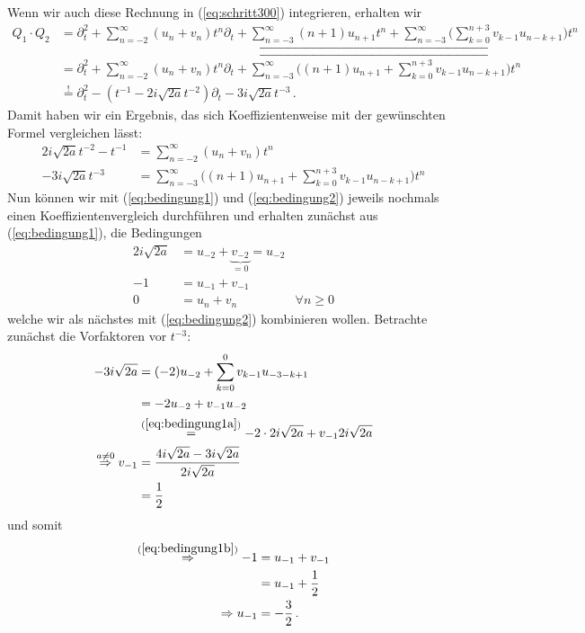 Wenn wir auch diese Rechnung in (\ref{eq:schritt300}) integrieren, erhalten wir
\begin{align*} \label{eq:schritt400}
Q_1\cdot Q_2&=\partial_t^2 + \sum_{n=-2}^\infty (u_n+v_n)t^n \partial_t
  + \underbracket{\sum_{n=-3}^\infty (n+1)u_{n+1}t^{n}
  + \sum_{n=-3}^\infty \Big( \sum_{k=0}^{n+3} v_{k-1}u_{n-k+1} \Big) t^{n}}
\\&=\partial_t^2 + \sum_{n=-2}^\infty (u_n+v_n)t^n \partial_t
  + \overbracket{\sum_{n=-3}^\infty
  \Big( (n+1)u_{n+1} + \sum_{k=0}^{n+3} v_{k-1}u_{n-k+1} \Big) t^{n}}
\\&\overset{!}{=} \partial_t^2 - (t^{-1} - 2i\sqrt{2a}t^{-2})\partial_t
  - 3 i\sqrt{2a}t^{-3} \,.
\end{align*}
Damit haben wir ein Ergebnis, das sich Koeffizientenweise mit der gewünschten
Formel vergleichen lässt:
\begin{align}
\label{eq:bedingung1}
2i\sqrt{2a}t^{-2} - t^{-1} &= \sum_{n=-2}^\infty (u_n+v_n)t^n
\\
\label{eq:bedingung2}
- 3 i\sqrt{2a}t^{-3} &= \sum_{n=-3}^\infty
  \Big( (n+1)u_{n+1} + \sum_{k=0}^{n+3} v_{k-1}u_{n-k+1} \Big) t^{n}
\end{align}
Nun können wir mit (\ref{eq:bedingung1}) und (\ref{eq:bedingung2}) jeweils
nochmals einen Koeffizientenvergleich durchführen und erhalten zunächst aus
(\ref{eq:bedingung1}), die Bedingungen
\begin{align}
2i\sqrt{2a} &= u_{-2} + \underset{=0}{\underbrace{v_{-2}}} = u_{-2}
\label{eq:bedingung1a}
\\-1 &= u_{-1} + v_{-1}
\label{eq:bedingung1b}
\\0 &= u_n + v_n & \forall n \geq 0
\label{eq:bedingung1c}
\end{align}
welche wir als nächstes mit (\ref{eq:bedingung2}) kombinieren wollen.
Betrachte zunächst die Vorfaktoren vor $t^{-3}$:
\begin{align*}
- 3 i\sqrt{2a} &= (-2)u_{-2} + \sum_{k=0}^{0} v_{k-1}u_{-3-k+1}
\\&= -2u_{-2} + v_{-1}u_{-2}
\\&\overset{(\ref{eq:bedingung1a})}{=} -2\cdot2i\sqrt{2a} + v_{-1}2i\sqrt{2a}
\\\overset{a\neq0}{\Rightarrow} v_{-1}
  &= \frac{4i\sqrt{2a}-3i\sqrt{2a}}{2i\sqrt{2a}}
\\&= \frac{1}{2}
\end{align*}
und somit
\begin{align*}
\overset{(\ref{eq:bedingung1b})}{\Rightarrow} -1 &=u_{-1}+v_{-1}
\\ &=u_{-1}+\frac{1}{2}
\\\Rightarrow u_{-1}&=-\frac{3}{2} \,.
\end{align*}
